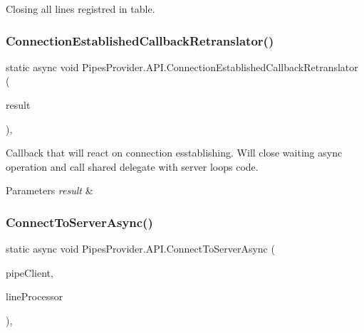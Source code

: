 Closing all lines registred in table. 

\mbox{\label{class_pipes_provider_1_1_a_p_i_a0feeed2f76dc4292c3b85fdd054bd77e}} 
\subsubsection{\texorpdfstring{Connection\+Established\+Callback\+Retranslator()}{ConnectionEstablishedCallbackRetranslator()}}
{\footnotesize\ttfamily static async void Pipes\+Provider.\+A\+P\+I.\+Connection\+Established\+Callback\+Retranslator (\begin{DoxyParamCaption}\item[{I\+Async\+Result}]{result }\end{DoxyParamCaption})\hspace{0.3cm}{\ttfamily [static]}, {\ttfamily [private]}}



Callback that will react on connection esstablishing. Will close waiting async operation and call shared delegate with server loop\textquotesingle{}s code. 


\begin{DoxyParams}{Parameters}
{\em result} & \\
\hline
\end{DoxyParams}
\mbox{\label{class_pipes_provider_1_1_a_p_i_a5314727d43f5fafc8630dbc814cebeac}} 
\subsubsection{\texorpdfstring{Connect\+To\+Server\+Async()}{ConnectToServerAsync()}}
{\footnotesize\ttfamily static async void Pipes\+Provider.\+A\+P\+I.\+Connect\+To\+Server\+Async (\begin{DoxyParamCaption}\item[{Named\+Pipe\+Client\+Stream}]{pipe\+Client,  }\item[{\mbox{\hyperlink{class_pipes_provider_1_1_transmission_line}{Transmission\+Line}}}]{line\+Processor }\end{DoxyParamCaption})\hspace{0.3cm}{\ttfamily [static]}, {\ttfamily [private]}}



